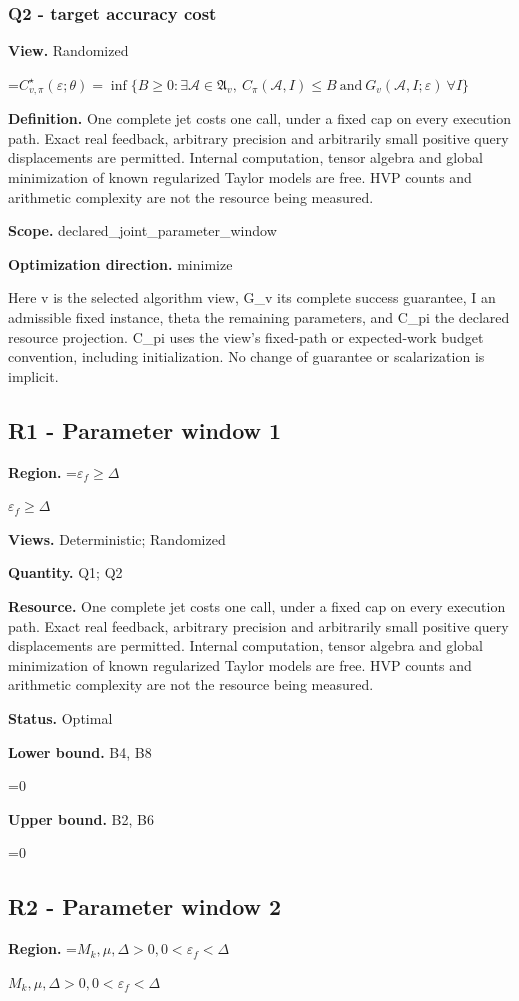 \documentclass[10pt,a4paper]{article}
\newcommand{\AtlasMath}[1]{\par\begingroup\centering\setbox0=\hbox{$\displaystyle #1$}\ifdim\wd0>1.4\linewidth\typeout{ATLAS WIDE FORMULA: \the\wd0}\fi\ifdim\wd0>\linewidth\resizebox{\linewidth}{!}{\box0}\else\box0\fi\par\endgroup}
\newcommand{\AtlasInlineMath}[1]{\begingroup\setbox0=\hbox{$#1$}\ifdim\wd0>.4\linewidth\endgroup\AtlasMath{#1}\else\endgroup$#1$\fi}
\begin{document}
\subsubsection{Q2 - target accuracy cost}
\textbf{View.} Randomized

\AtlasMath{C^\star_{v,\pi}(\varepsilon;\theta)=\inf\{B\ge0:\exists\mathcal A\in\mathfrak A_v,\ C_\pi(\mathcal A,I)\le B\ \text{and}\ G_v(\mathcal A,I;\varepsilon)\ \forall I\}}
\textbf{Definition.} One complete jet costs one call, under a fixed cap on every execution path. Exact real feedback, arbitrary precision and arbitrarily small positive query displacements are permitted. Internal computation, tensor algebra and global minimization of known regularized Taylor models are free. HVP counts and arithmetic complexity are not the resource being measured.

\textbf{Scope.} declared\_joint\_parameter\_window

\textbf{Optimization direction.} minimize

Here v is the selected algorithm view, G\_v its complete success guarantee, I an admissible fixed instance, theta the remaining parameters, and C\_pi the declared resource projection. C\_pi uses the view's fixed-path or expected-work budget convention, including initialization. No change of guarantee or scalarization is implicit.

\subsection{R1 - Parameter window 1}
\textbf{Region.} \AtlasInlineMath{\varepsilon_f\ge \Delta}

\textbf{Views.} Deterministic; Randomized

\textbf{Quantity.} Q1; Q2

\textbf{Resource.} One complete jet costs one call, under a fixed cap on every execution path. Exact real feedback, arbitrary precision and arbitrarily small positive query displacements are permitted. Internal computation, tensor algebra and global minimization of known regularized Taylor models are free. HVP counts and arithmetic complexity are not the resource being measured.

\textbf{Status.} Optimal

\textbf{Lower bound.} B4, B8

\AtlasMath{0}
\textbf{Upper bound.} B2, B6

\AtlasMath{0}
\subsection{R2 - Parameter window 2}
\textbf{Region.} \AtlasInlineMath{M_k,\mu,\Delta>0,0<\varepsilon_f<\Delta}
\end{document}

